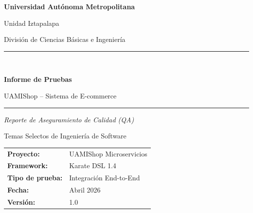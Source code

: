 \documentclass[12pt,a4paper]{article}
\begin{document}
\begin{titlepage}
  \centering
  \vspace*{1.5cm}

  {\Large\bfseries Universidad Aut\'onoma Metropolitana\par}
  \vspace{0.3cm}
  {\large Unidad Iztapalapa\par}
  \vspace{0.3cm}
  {\large Divisi\'on de Ciencias B\'asicas e Ingenier\'ia\par}

  \vspace{1.5cm}
  \rule{\linewidth}{0.8pt}\\[0.4cm]
  {\LARGE\bfseries Informe de Pruebas\par}
  \vspace{0.3cm}
  {\Large UAMIShop -- Sistema de E-commerce\par}
  \rule{\linewidth}{0.8pt}

  \vspace{1.2cm}
  {\large\itshape Reporte de Aseguramiento de Calidad (QA)\par}
  \vspace{0.5cm}
  {\normalsize Temas Selectos de Ingenier\'ia de Software\par}

  \vfill

  \begin{tabular}{ll}
    \textbf{Proyecto:}       & UAMIShop Microservicios \\[4pt]
    \textbf{Framework:}      & Karate DSL 1.4 \\[4pt]
    \textbf{Tipo de prueba:} & Integraci\'on End-to-End \\[4pt]
    \textbf{Fecha:}          & Abril 2026 \\[4pt]
    \textbf{Versi\'on:}      & 1.0 \\
  \end{tabular}

  \vspace{1.5cm}

  \vspace{0.8cm}
\end{titlepage}
\end{document}
